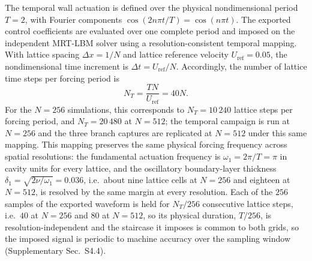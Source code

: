 \documentclass[11pt,a4paper]{article}
\newenvironment{chgadd}{\par\color{blue}}{\par\color{black}}
\begin{document}
\begin{chgadd}
The temporal wall actuation is defined over the physical nondimensional period
$T=2$, with Fourier components $\cos(2n\pi t/T)=\cos(n\pi t)$. The exported
control coefficients are evaluated over one complete period and imposed on the
independent MRT-LBM solver using a resolution-consistent temporal mapping. With
lattice spacing $\Delta x=1/N$ and lattice reference velocity
$U_{\mathrm{ref}}=0.05$, the nondimensional time increment is
$\Delta t=U_{\mathrm{ref}}/N$. Accordingly, the number of lattice time steps per
forcing period is
\begin{equation}
N_T=\frac{TN}{U_{\mathrm{ref}}}=40N .
\label{eq:NT}
\end{equation}
For the $N=256$ simulations, this corresponds to $N_T=10\,240$ lattice steps per
forcing period, and $N_T=20\,480$ at $N=512$; the temporal campaign is run at
$N=256$ and the three branch captures are replicated at $N=512$ under this same
mapping. This mapping preserves the same physical forcing frequency across
spatial resolutions: the fundamental actuation frequency is
$\omega_1=2\pi/T=\pi$ in cavity units for every lattice, and the oscillatory
boundary-layer thickness $\delta_1=\sqrt{2\nu/\omega_1}=0.036$, i.e.\ about nine
lattice cells at $N=256$ and eighteen at $N=512$, is resolved by the same margin
at every resolution. Each
of the $256$ samples of the exported waveform is held for $N_T/256$ consecutive
lattice steps, i.e.\ $40$ at $N=256$ and $80$ at $N=512$, so its physical
duration, $T/256$, is resolution-independent and the staircase it imposes is
common to both grids,
so the imposed signal is periodic to machine accuracy over the
sampling window (Supplementary Sec.~S4.4).


\end{chgadd}
\end{document}
